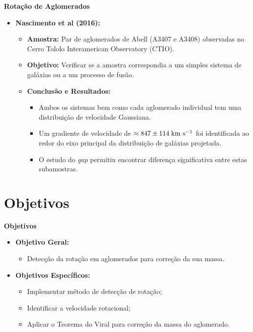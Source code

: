 \documentclass[xcolor=dvipsnames,10pt]{beamer}
\begin{document}
\begin{frame}{\textbf{Rotação de Aglomerados}}
\begin{itemize}
  \item {\textbf{Nascimento et al (2016):}}  
    \begin{itemize}
      \item \textbf{Amostra:} Par de aglomerados de Abell (A3407 e A3408) observadas no Cerro Tololo Interamerican Observatory (CTIO).
      \item \textbf{Objetivo:} Verificar se a amostra correspondia a um simples sistema de galáxias ou a um processo de fusão.
      \item \textbf{Conclusão e Resultados:}
      \begin{itemize}
        \item Ambos os sistemas bem como cada aglomerado individual tem uma distribuição de velocidade Gaussiana.
        \item Um gradiente de velocidade de $\approx 847 \pm 114\; {\rm km~s^{-1}}$ foi identificada ao redor do eixo principal da distribuição de galáxias projetada.
        \item O estudo do \textit{gap} permitiu encontrar diferença significativa entre estas subamostras.
      \end{itemize}
    \end{itemize}
\end{itemize}
\end{frame}

\section{Objetivos}
\begin{frame}{\textbf{Objetivos}}
  \begin{itemize}
    \item {\textbf{Objetivo Geral: }}
    \begin{itemize}
      \item Detecção da rotação em aglomerados para correção da sua massa.
    \end{itemize}
    \item {\textbf{Objetivos Específicos: }}
    \begin{itemize}
      \item Implementar método de detecção de rotação;
      \item Identificar a velocidade rotacional;
      \item Aplicar o Teorema do Viral para correção da massa do aglomerado.
    \end{itemize}
  \end{itemize}
\end{frame}
\end{document}
